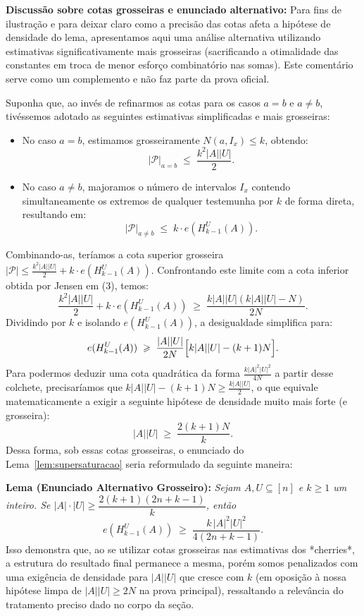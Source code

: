 \documentclass[reqno,a4paper,12pt]{amsart}
\begin{document}
\begin{remark}\label{rem:cotas-grosseiras}
  \textbf{Discussão sobre cotas grosseiras e enunciado alternativo:}
  Para fins de ilustração e para deixar claro como a precisão das cotas afeta a hipótese de densidade do lema, apresentamos aqui uma análise alternativa utilizando estimativas significativamente mais grosseiras (sacrificando a otimalidade das constantes em troca de menor esforço combinatório nas somas). Este comentário serve como um complemento e não faz parte da prova oficial.

  Suponha que, ao invés de refinarmos as cotas para os casos $a = b$ e $a \neq b$, tivéssemos adotado as seguintes estimativas simplificadas e mais grosseiras:
  \begin{itemize}
    \item No caso $a = b$, estimamos grosseiramente $N(a, I_x) \leq k$, obtendo:
          \[
            |\mathcal{P}|_{a=b} \;\leq\; \frac{k^2 |A||U|}{2}.
          \]
    \item No caso $a \neq b$, majoramos o número de intervalos $I_x$ contendo simultaneamente os extremos de qualquer testemunha por $k$ de forma direta, resultando em:
          \[
            |\mathcal{P}|_{a \neq b} \;\leq\; k \cdot e(H_{k-1}^U(A)).
          \]
  \end{itemize}
  Combinando-as, teríamos a cota superior grosseira $|\mathcal{P}| \leq \frac{k^2 |A||U|}{2} + k \cdot e(H_{k-1}^U(A))$. Confrontando este limite com a cota inferior obtida por Jensen em (3), temos:
  \[
    \frac{k^2 |A||U|}{2} + k \cdot e(H_{k-1}^U(A)) \;\geq\; \frac{k|A||U|(k|A||U|-N)}{2N}.
  \]
  Dividindo por $k$ e isolando $e(H_{k-1}^U(A))$, a desigualdade simplifica para:
  \[
    e(H_{k-1}^U(A)) \;\geq\; \frac{|A||U|}{2N}\Bigl[ k|A||U| - (k+1)N \Bigr].
  \]
  Para podermos deduzir uma cota quadrática da forma $\frac{k|A|^2|U|^2}{4N}$ a partir desse colchete, precisaríamos que $k|A||U| - (k+1)N \geq \frac{k|A||U|}{2}$, o que equivale matematicamente a exigir a seguinte hipótese de densidade muito mais forte (e grosseira):
  \[
    |A||U| \;\geq\; \frac{2(k+1)N}{k}.
  \]
  Dessa forma, sob essas cotas grosseiras, o enunciado do Lema~\ref{lem:supersaturacao} seria reformulado da seguinte maneira:

  \medskip
  \noindent\textbf{Lema (Enunciado Alternativo Grosseiro):}
  \textit{Sejam $A, U \subseteq [n]$ e $k \geq 1$ um inteiro. Se $|A| \cdot |U| \geq \dfrac{2(k+1)(2n+k-1)}{k}$, então}
  \[
    e(H_{k-1}^U(A)) \;\geq\; \frac{k\,|A|^2|U|^2}{4(2n+k-1)}.
  \]
  Isso demonstra que, ao se utilizar cotas grosseiras nas estimativas dos *cherries*, a estrutura do resultado final permanece a mesma, porém somos penalizados com uma exigência de densidade para $|A||U|$ que cresce com $k$ (em oposição à nossa hipótese limpa de $|A||U| \geq 2N$ na prova principal), ressaltando a relevância do tratamento preciso dado no corpo da seção.
\end{remark}
\end{document}
